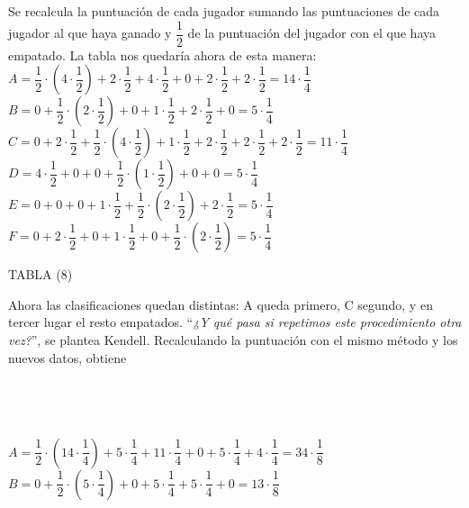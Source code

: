 \documentclass[a4paper]{article}
\begin{document}
Se recalcula la puntuación de cada jugador sumando las puntuaciones de cada jugador al que haya ganado y $\dfrac{1}{2}$ de la puntuación del jugador con el que haya empatado. La tabla nos quedaría ahora de esta manera:\\

$
A= \dfrac{1}{2}\cdot(4\cdot\dfrac{1}{2})+ 2\cdot\dfrac{1}{2}+ 4\cdot\dfrac{1}{2} + 0 + 2\cdot\dfrac{1}{2} + 2\cdot\dfrac{1}{2} = 14\cdot\dfrac{1}{4}
$\\

$
B= 0 + \dfrac{1}{2}\cdot(2\cdot\dfrac{1}{2})+ 0 + 1\cdot\dfrac{1}{2} + 2\cdot\dfrac{1}{2} + 0 = 5\cdot\dfrac{1}{4}
$\\

$
C= 0 + 2\cdot\dfrac{1}{2}+ \dfrac{1}{2}\cdot(4\cdot\dfrac{1}{2}) + 1\cdot\dfrac{1}{2} + 2\cdot\dfrac{1}{2} + 2\cdot\dfrac{1}{2} + 2\cdot\dfrac{1}{2} = 11\cdot\dfrac{1}{4}
$\\

$
D= 4\cdot\dfrac{1}{2} + 0 + 0 + \dfrac{1}{2}\cdot(1\cdot\dfrac{1}{2}) + 0 + 0 = 5\cdot\dfrac{1}{4}
$\\

$
E= 0 + 0 + 0 + 1\cdot\dfrac{1}{2} + \dfrac{1}{2}\cdot(2\cdot\dfrac{1}{2}) + 2\cdot\dfrac{1}{2} = 5\cdot\dfrac{1}{4}
$\\

$
F= 0 + 2\cdot\dfrac{1}{2} + 0 + 1\cdot\dfrac{1}{2} + 0 + \dfrac{1}{2}\cdot(2\cdot\dfrac{1}{2}) = 5\cdot\dfrac{1}{4}
$\\

\begin{center}
TABLA (8)
\end{center}
	Ahora las clasificaciones quedan distintas: A queda primero, C segundo, y en tercer lugar el resto empatados. “\textit{¿Y qué pasa si repetimos este procedimiento otra vez?}”, se plantea Kendell. Recalculando la puntuación con el mismo método y los nuevos datos, obtiene \\\\\\\\\\
	
$
A= \dfrac{1}{2}\cdot(14\cdot\dfrac{1}{4})+ 5\cdot\dfrac{1}{4}+ 11\cdot\dfrac{1}{4} + 0 + 5\cdot\dfrac{1}{4} + 4\cdot\dfrac{1}{4} = 34\cdot\dfrac{1}{8}
$\\

$
B= 0 + \dfrac{1}{2}\cdot(5\cdot\dfrac{1}{4})+ 0 + 5\cdot\dfrac{1}{4} + 5\cdot\dfrac{1}{4} + 0 = 13\cdot\dfrac{1}{8}
$\\
\end{document}
